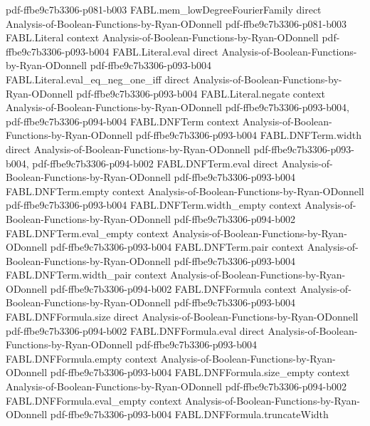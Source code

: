 \begin{theorem}
  {pdf-ffbe9c7b3306-p081-b003}
\proofstep
  {FABL.mem_lowDegreeFourierFamily}
  {direct}
  {Analysis-of-Boolean-Functions-by-Ryan-ODonnell}
  {pdf-ffbe9c7b3306-p081-b003}
\proofstep
  {FABL.Literal}
  {context}
  {Analysis-of-Boolean-Functions-by-Ryan-ODonnell}
  {pdf-ffbe9c7b3306-p093-b004}
\proofstep
  {FABL.Literal.eval}
  {direct}
  {Analysis-of-Boolean-Functions-by-Ryan-ODonnell}
  {pdf-ffbe9c7b3306-p093-b004}
\proofstep
  {FABL.Literal.eval_eq_neg_one_iff}
  {direct}
  {Analysis-of-Boolean-Functions-by-Ryan-ODonnell}
  {pdf-ffbe9c7b3306-p093-b004}
\proofstep
  {FABL.Literal.negate}
  {context}
  {Analysis-of-Boolean-Functions-by-Ryan-ODonnell}
  {pdf-ffbe9c7b3306-p093-b004,
    pdf-ffbe9c7b3306-p094-b004}
\proofstep
  {FABL.DNFTerm}
  {context}
  {Analysis-of-Boolean-Functions-by-Ryan-ODonnell}
  {pdf-ffbe9c7b3306-p093-b004}
\proofstep
  {FABL.DNFTerm.width}
  {direct}
  {Analysis-of-Boolean-Functions-by-Ryan-ODonnell}
  {pdf-ffbe9c7b3306-p093-b004,
    pdf-ffbe9c7b3306-p094-b002}
\proofstep
  {FABL.DNFTerm.eval}
  {direct}
  {Analysis-of-Boolean-Functions-by-Ryan-ODonnell}
  {pdf-ffbe9c7b3306-p093-b004}
\proofstep
  {FABL.DNFTerm.empty}
  {context}
  {Analysis-of-Boolean-Functions-by-Ryan-ODonnell}
  {pdf-ffbe9c7b3306-p093-b004}
\proofstep
  {FABL.DNFTerm.width_empty}
  {context}
  {Analysis-of-Boolean-Functions-by-Ryan-ODonnell}
  {pdf-ffbe9c7b3306-p094-b002}
\proofstep
  {FABL.DNFTerm.eval_empty}
  {context}
  {Analysis-of-Boolean-Functions-by-Ryan-ODonnell}
  {pdf-ffbe9c7b3306-p093-b004}
\proofstep
  {FABL.DNFTerm.pair}
  {context}
  {Analysis-of-Boolean-Functions-by-Ryan-ODonnell}
  {pdf-ffbe9c7b3306-p093-b004}
\proofstep
  {FABL.DNFTerm.width_pair}
  {context}
  {Analysis-of-Boolean-Functions-by-Ryan-ODonnell}
  {pdf-ffbe9c7b3306-p094-b002}
\proofstep
  {FABL.DNFFormula}
  {context}
  {Analysis-of-Boolean-Functions-by-Ryan-ODonnell}
  {pdf-ffbe9c7b3306-p093-b004}
\proofstep
  {FABL.DNFFormula.size}
  {direct}
  {Analysis-of-Boolean-Functions-by-Ryan-ODonnell}
  {pdf-ffbe9c7b3306-p094-b002}
\proofstep
  {FABL.DNFFormula.eval}
  {direct}
  {Analysis-of-Boolean-Functions-by-Ryan-ODonnell}
  {pdf-ffbe9c7b3306-p093-b004}
\proofstep
  {FABL.DNFFormula.empty}
  {context}
  {Analysis-of-Boolean-Functions-by-Ryan-ODonnell}
  {pdf-ffbe9c7b3306-p093-b004}
\proofstep
  {FABL.DNFFormula.size_empty}
  {context}
  {Analysis-of-Boolean-Functions-by-Ryan-ODonnell}
  {pdf-ffbe9c7b3306-p094-b002}
\proofstep
  {FABL.DNFFormula.eval_empty}
  {context}
  {Analysis-of-Boolean-Functions-by-Ryan-ODonnell}
  {pdf-ffbe9c7b3306-p093-b004}
\proofstep
  {FABL.DNFFormula.truncateWidth}

\end{theorem}
